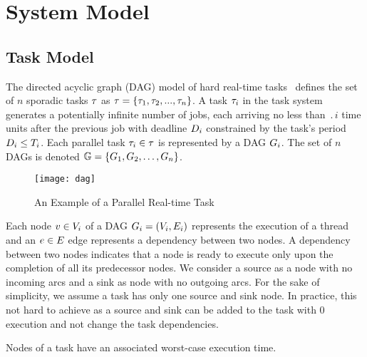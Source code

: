 \section{System Model}

\subsection{Task Model}
The directed acyclic graph (DAG) model of hard real-time
tasks~\addcite{} defines the set of ${n}$ sporadic tasks $\tau$ as
$\tau{} = \{\tau_{1},\tau_{2}, ..., \tau_{n}\}$. A task $\tau_{i}$
in the task system generates a potentially infinite number of jobs,
each arriving no less than $\period{i}$ time units after the previous
job with deadline ${D_{i}}$ constrained by the task's period
$D_{i} \leq T_{i}$. Each parallel task $\tau_{i} \in
\tau$ is represented by a DAG ${\Dag{i}}$. The set of ${n}$ DAGs is
denoted ${\dagset = \{\Dag{1}, \Dag{2}, \ldots, \Dag{n}\}}$.

\begin{figure}[!h]
  \centering
  \texttt{[image: dag]}
  \caption{An Example of a Parallel Real-time Task}
  \label{fig:dag}
\end{figure}

Each node ${\node{1} \in \nodeset{i}}$ of a DAG ${\Dag{i} = (\nodeset{i}, \edgeset{i})}$ represents the
execution of a thread and an ${\edge \in \edgeset{}}$ edge represents a
dependency between two nodes. A dependency between two nodes indicates
that a node is ready to execute only upon the completion of all its
predecessor nodes. We consider a source as a node with no incoming
arcs and a sink as node with no outgoing arcs. For the sake of
simplicity, we assume a task has only one source and sink node. In
practice, this not hard to achieve as a source and sink can be added
to the task with $0$ execution and not change the task dependencies.

Nodes of a task have an associated worst-case execution time. 

